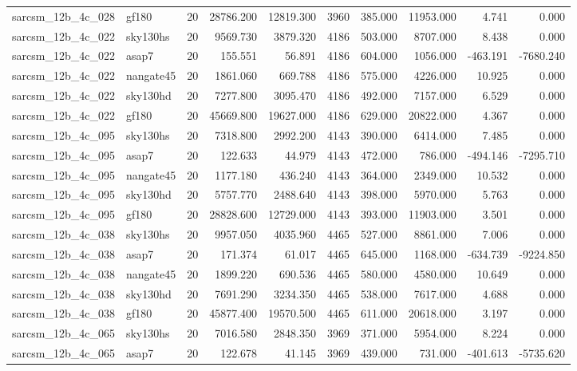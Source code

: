 \begin{longtable}{llrrrrrrrr}
sarcsm\_12b\_4c\_028 & gf180 & 20 & 28786.200 & 12819.300 & 3960 & 385.000 & 11953.000 & 4.741 & 0.000 \\
sarcsm\_12b\_4c\_022 & sky130hs & 20 & 9569.730 & 3879.320 & 4186 & 503.000 & 8707.000 & 8.438 & 0.000 \\
sarcsm\_12b\_4c\_022 & asap7 & 20 & 155.551 & 56.891 & 4186 & 604.000 & 1056.000 & -463.191 & -7680.240 \\
sarcsm\_12b\_4c\_022 & nangate45 & 20 & 1861.060 & 669.788 & 4186 & 575.000 & 4226.000 & 10.925 & 0.000 \\
sarcsm\_12b\_4c\_022 & sky130hd & 20 & 7277.800 & 3095.470 & 4186 & 492.000 & 7157.000 & 6.529 & 0.000 \\
sarcsm\_12b\_4c\_022 & gf180 & 20 & 45669.800 & 19627.000 & 4186 & 629.000 & 20822.000 & 4.367 & 0.000 \\
sarcsm\_12b\_4c\_095 & sky130hs & 20 & 7318.800 & 2992.200 & 4143 & 390.000 & 6414.000 & 7.485 & 0.000 \\
sarcsm\_12b\_4c\_095 & asap7 & 20 & 122.633 & 44.979 & 4143 & 472.000 & 786.000 & -494.146 & -7295.710 \\
sarcsm\_12b\_4c\_095 & nangate45 & 20 & 1177.180 & 436.240 & 4143 & 364.000 & 2349.000 & 10.532 & 0.000 \\
sarcsm\_12b\_4c\_095 & sky130hd & 20 & 5757.770 & 2488.640 & 4143 & 398.000 & 5970.000 & 5.763 & 0.000 \\
sarcsm\_12b\_4c\_095 & gf180 & 20 & 28828.600 & 12729.000 & 4143 & 393.000 & 11903.000 & 3.501 & 0.000 \\
sarcsm\_12b\_4c\_038 & sky130hs & 20 & 9957.050 & 4035.960 & 4465 & 527.000 & 8861.000 & 7.006 & 0.000 \\
sarcsm\_12b\_4c\_038 & asap7 & 20 & 171.374 & 61.017 & 4465 & 645.000 & 1168.000 & -634.739 & -9224.850 \\
sarcsm\_12b\_4c\_038 & nangate45 & 20 & 1899.220 & 690.536 & 4465 & 580.000 & 4580.000 & 10.649 & 0.000 \\
sarcsm\_12b\_4c\_038 & sky130hd & 20 & 7691.290 & 3234.350 & 4465 & 538.000 & 7617.000 & 4.688 & 0.000 \\
sarcsm\_12b\_4c\_038 & gf180 & 20 & 45877.400 & 19570.500 & 4465 & 611.000 & 20618.000 & 3.197 & 0.000 \\
sarcsm\_12b\_4c\_065 & sky130hs & 20 & 7016.580 & 2848.350 & 3969 & 371.000 & 5954.000 & 8.224 & 0.000 \\
sarcsm\_12b\_4c\_065 & asap7 & 20 & 122.678 & 41.145 & 3969 & 439.000 & 731.000 & -401.613 & -5735.620 \\

\end{longtable}
